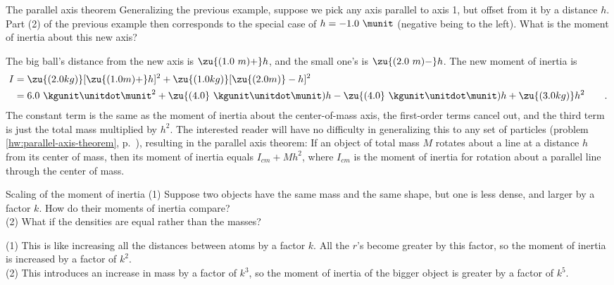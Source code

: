 \begin{eg}{The parallel axis theorem}
\egquestion
Generalizing the previous example, suppose we pick
any axis parallel to axis 1, but offset from it by a
distance $h$. Part (2) of the previous example then
corresponds to the special case of $h=- 1.0\ \munit$ (negative being
to the left). What is the moment of inertia about this new
axis?

\eganswer
The big ball's distance from the new axis is 
$\zu{(1.0\ m)+} h$, and the small one's is $\zu{(2.0\ m)-} h$. The new moment of
inertia is
\begin{align*}
         I        &=  \zu{(2.0 kg)}[\zu{(1.0 m)+} h]^2 + \zu{(1.0 kg)}[\zu{(2.0 m)}- h]^2 \\
                &        =   6.0 \ \kgunit\unitdot\munit^2         
                        + \zu{(4.0}\ \kgunit\unitdot\munit) h
                        - \zu{(4.0}\ \kgunit\unitdot\munit) h
                        + \zu{(3.0 kg)} h^2 \qquad .
\end{align*}
The constant term is the same as the moment of inertia about
the center-of-mass axis, the first-order terms cancel out,
and the third term is just the total mass multiplied by $h^2$.
The interested reader will have no difficulty in
generalizing this to any set of particles (problem \ref{hw:parallel-axis-theorem}, p.~\pageref{hw:parallel-axis-theorem}), resulting in the
parallel axis theorem:
 If an object of total mass $M$ rotates
about a line at a distance $h$ from its center of mass, then
its moment of inertia equals $I_{cm}+ Mh^2$, where $I_{cm}$ is the
moment of inertia for rotation about a parallel line through
the center of mass.
\end{eg}

\begin{eg}{Scaling of the moment of inertia}
\egquestion
(1) Suppose two objects have the same mass and the
same shape, but one is less dense, and larger by a factor $k$.
How do their moments of inertia compare? \\
(2) What if the
densities are equal rather than the masses?

\eganswer
(1) This is like increasing all the distances
between atoms by a factor $k$. All the $r$'s become greater by
this factor, so the moment of inertia is increased by a
factor of $k^2$.\\
(2) This introduces an increase in mass by a
factor of $k^3$, so the moment of inertia of the bigger object
is greater by a factor of $k^5$.
\end{eg}

